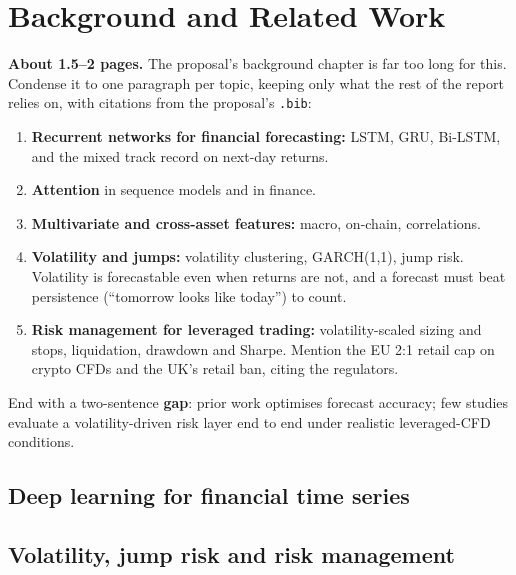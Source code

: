 \section{Background and Related Work}\label{sec:background}

\begin{guide}
\textbf{About 1.5--2 pages.} The proposal's background chapter is far too long for this. Condense it to one paragraph per topic, keeping only what the rest of the report relies on, with citations from the proposal's \texttt{.bib}:
\begin{enumerate}
  \item \textbf{Recurrent networks for financial forecasting:} LSTM, GRU, Bi-LSTM, and the mixed track record on next-day returns.
  \item \textbf{Attention} in sequence models and in finance.
  \item \textbf{Multivariate and cross-asset features:} macro, on-chain, correlations.
  \item \textbf{Volatility and jumps:} volatility clustering, GARCH(1,1), jump risk. Volatility is forecastable even when returns are not, and a forecast must beat persistence (``tomorrow looks like today'') to count.
  \item \textbf{Risk management for leveraged trading:} volatility-scaled sizing and stops, liquidation, drawdown and Sharpe. Mention the EU 2:1 retail cap on crypto CFDs and the UK's retail ban, citing the regulators.
\end{enumerate}
End with a two-sentence \textbf{gap}: prior work optimises forecast accuracy; few studies evaluate a volatility-driven risk layer end to end under realistic leveraged-CFD conditions.
\end{guide}

\subsection{Deep learning for financial time series}
\tbc{}

\subsection{Volatility, jump risk and risk management}
\tbc{}
